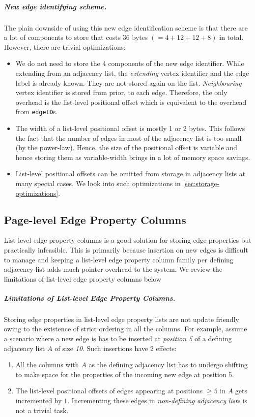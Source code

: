 \vspace{-12pt}
\subparagraph{New edge identifying scheme.} The plain downside of using this new edge identification scheme is that there are a lot of components to store that costs 36 bytes $(=4+12+12+8)$ in total. However, there are trivial optimizations: 
\begin{itemize}
	\item We do not need to store the 4 components of the new edge identifier. While extending from an adjacency list, the \emph{extending} vertex identifier and the edge label is already known. They are not stored again on the list. \emph{Neighbouring} vertex identifier is stored from prior, to each edge. Therefore, the only overhead is the list-level positional offset which is equivalent to the overhead from \texttt{edgeID}s.
	\item The width of a list-level positional offset is mostly 1 or 2 bytes. This follows the fact that the number of edges in most of the adjacency list is too small (by the power-law). Hence, the size of the positional offset is variable and hence storing them as variable-width brings in a lot of memory space savings.
	\item List-level positional offsets can be omitted from storage in adjacency lists at many special cases. We look into such optimizations in \ref{sec:storage-optimizations}.
\end{itemize}

\subsection{Page-level Edge Property Columns}

List-level edge property columns is a good solution for storing edge properties but practically infeasible. This is primarily because insertion on new edges is difficult to manage and keeping a list-level edge property column family per defining adjacency list adds much pointer overhead to the system. We review the limitations of list-level edge property columns below


\vspace{-12pt}
\subparagraph{Limitations of List-level Edge Property Columns.}
Storing edge properties in list-level edge property lists are not update friendly owing to the existence of strict ordering in all the columns. For example, assume a scenario where a new edge is has to be inserted at \emph{position 5} of a defining adjacency list $A$ of size \emph{10}. Such insertions have 2 effects: 
\begin{enumerate}
	\item All the columns with $A$ as the defining adjacency list has to undergo shifting to make space for the properties of the incoming new edge at position 5.
	\item The list-level positional offsets of edges appearing at positions $\geq 5$ in $A$ gets incremented by $1$. Incrementing these edges in \emph{non-defining adjacency lists} is not a trivial task.  
\end{enumerate}

